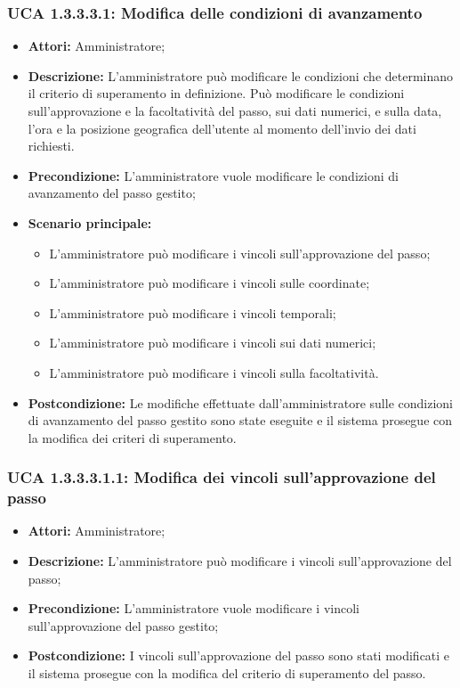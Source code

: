 \subsubsection{UCA 1.3.3.3.1: Modifica delle condizioni di avanzamento}
\begin{itemize}
\item \textbf{Attori:}
 Amministratore;
\item \textbf{Descrizione:} 
L'amministratore può modificare le condizioni che determinano il criterio di superamento in definizione.
Può modificare le condizioni sull'approvazione e la facoltatività del passo, sui dati numerici, e sulla data, l'ora e la posizione geografica dell'utente al momento dell'invio dei dati richiesti.
\item \textbf{Precondizione:}
 L'amministratore vuole modificare le condizioni di avanzamento del passo gestito;
\item \textbf{Scenario principale:} 
\begin{itemize}
\item L'amministratore può modificare i vincoli sull'approvazione del passo;
\item L'amministratore può modificare i vincoli sulle coordinate;
\item L'amministratore può modificare i vincoli temporali;
\item L'amministratore può modificare i vincoli sui dati numerici;
\item L'amministratore può modificare i vincoli sulla facoltatività.
\end{itemize}
\item \textbf{Postcondizione:}
 Le modifiche effettuate dall'amministratore sulle condizioni di avanzamento del passo gestito sono state eseguite e il sistema prosegue con la modifica dei criteri di superamento. 
\end{itemize}

\hypertarget{A1.3.3.3.1.1}{}
\subsubsection{UCA 1.3.3.3.1.1: Modifica dei vincoli sull'approvazione del passo}
\begin{itemize}
\item \textbf{Attori:}
 Amministratore;
\item \textbf{Descrizione:} 
L'amministratore può modificare i vincoli sull'approvazione del passo;
\item \textbf{Precondizione:} 
L'amministratore vuole modificare i vincoli sull'approvazione del passo gestito;
\item \textbf{Postcondizione:} 
I vincoli sull'approvazione del passo sono stati modificati e il sistema prosegue con la modifica del criterio di superamento del passo.
\end{itemize}


